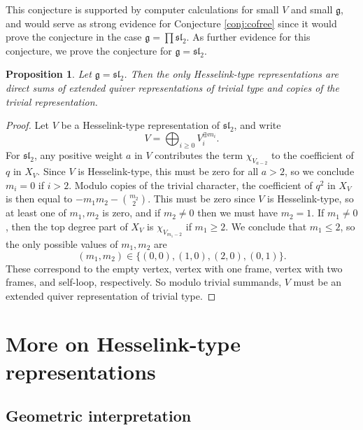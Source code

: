 \documentclass[12pt]{article}
\renewcommand{\sl}{\mathfrak{sl}}
\newtheorem{proposition}[theorem]{Proposition}
\theoremstyle{definition}
\theoremstyle{remark}
\newcommand{\g}{\mathfrak{g}}
\begin{document}
This conjecture is supported by computer calculations for small $V$ and small $\g$, and would serve as strong evidence for Conjecture \ref{conj:cofree} since it would prove the conjecture in the case $\g=\prod\sl_2$. As further evidence for this conjecture, we prove the conjecture for $\g=\sl_2$.

\begin{proposition}\label{prop:sl2}
    Let $\g=\sl_2$. Then the only Hesselink-type representations are direct sums of extended quiver representations of trivial type and copies of the trivial representation.
\end{proposition}
\begin{proof}
    Let $V$ be a Hesselink-type representation of $\sl_2$, and write
    \[V=\bigoplus_{i\geq 0}V_i^{\oplus m_i}.\]
    For $\sl_2$, any positive weight $a$ in $V$ contributes the term $\chi_{V_{a-2}}$ to the coefficient of $q$ in $X_V$. Since $V$ is Hesselink-type, this must be zero for all $a>2$, so we conclude $m_i=0$ if $i>2$. Modulo copies of the trivial character, the coefficient of $q^2$ in $X_V$ is then equal to $-m_1m_2-{m_2\choose{2}}$. This must be zero since $V$ is Hesselink-type, so at least one of $m_1,m_2$ is zero, and if $m_2\neq 0$ then we must have $m_2=1$. If $m_1\neq 0$, then the top degree part of $X_V$ is $\chi_{V_{m_1-2}}$ if $m_1\geq 2$. We conclude that $m_1\leq 2$, so the only possible values of $m_1,m_2$ are
    \[(m_1,m_2)\in\{(0,0),(1,0),(2,0),(0,1)\}.\]
    These correspond to the empty vertex, vertex with one frame, vertex with two frames, and self-loop, respectively. So modulo trivial summands, $V$ must be an extended quiver representation of trivial type.
\end{proof}

\section{More on Hesselink-type representations}\label{sec:small}

\subsection{Geometric interpretation}
\end{document}
